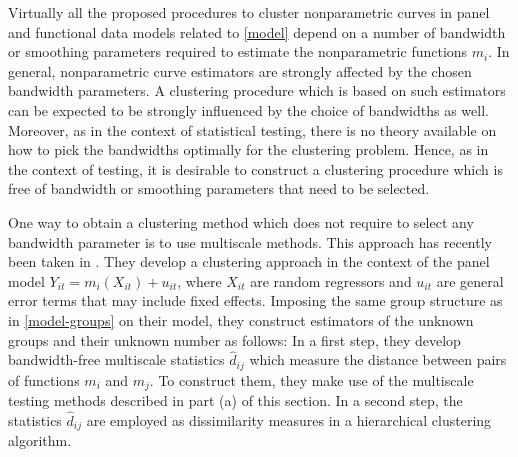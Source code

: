 \documentclass[a4paper,12pt]{article}
\begin{document}
Virtually all the proposed procedures to cluster nonparametric curves in panel and functional data models related to \eqref{model} depend on a number of bandwidth or smoothing parameters required to estimate the nonparametric functions $m_i$. In general, nonparametric curve estimators are strongly affected by the chosen bandwidth parameters. A clustering procedure which is based on such estimators can be expected to be strongly influenced by the choice of bandwidths as well. Moreover, as in the context of statistical testing, there is no theory available on how to pick the bandwidths optimally for the clustering problem. Hence, as in the context of testing, it is desirable to construct a clustering procedure which is free of bandwidth or smoothing parameters that need to be selected. 




One way to obtain a clustering method which does not require to select any bandwidth parameter is to use multiscale methods. This approach has recently been taken in \cite{VogtLinton2018}. They develop a clustering approach in the context of the panel model $Y_{it} = m_i(X_{it}) + u_{it}$, where $X_{it}$ are random regressors and $u_{it}$ are general error terms that may include fixed effects. Imposing the same group structure as in \eqref{model-groups} on their  model, they construct estimators of the unknown groups and their unknown number as follows: In a first step, they develop bandwidth-free multiscale statistics $\hat{d}_{ij}$ which measure the distance between pairs of functions $m_i$ and $m_j$. To construct them, they make use of the multiscale testing methods described in part (a) of this section. In a second step, the statistics $\hat{d}_{ij}$ are employed as dissimilarity measures in a hierarchical clustering algorithm. 


\newpage

{\small
\setlength{\bibsep}{0.55em}
}

\newpage
\end{document}
